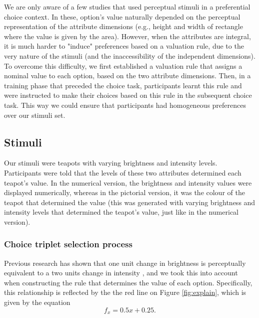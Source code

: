 \documentclass[11pt,a4paper]{article}
\begin{document}
We are only aware of a few studies that used perceptual stimuli in a preferential choice context. In these, option's value naturally depended on the perceptual representation of the attribute dimensions (e.g., height and width of rectangle where the value is given by the area). However, when the attributes are integral, it is much harder to "induce" preferences based on a valuation rule, due to the very nature of the stimuli (and the inaccessibility of the independent dimensions). To overcome this difficulty, we first established a valuation rule that assigns a nominal value to each option, based on the two attribute dimensions. Then, in a training phase that preceded the choice task, participants learnt this rule and were instructed to make their choices based on this rule in the subsequent choice task. This way we could ensure that participants had homogeneous preferences over our stimuli set. 



\subsection{Stimuli}

Our stimuli were teapots with varying brightness and intensity levels. Participants were told that the levels of these two attributes determined each teapot's value. In the numerical version, the brightness and intensity values were displayed numerically, whereas in the pictorial version, it was the colour of the teapot that determined the value (this was generated with varying brightness and intensity levels that determined the teapot's value, just like in the numerical version).  

\subsubsection{Choice triplet selection process}


Previous research has shown that one unit change in brightness is perceptually equivalent to a two units change in intensity \cite{Newhall1940}, and we took this into account when constructing the rule that determines the value of each option. Specifically, this relationship is reflected by the the red line on Figure \ref{fig:explain}, which is given by the equation
\begin{equation} \label{eq:redline}
 f_{x} = 0.5x + 0.25.
\end{equation}
\end{document}
